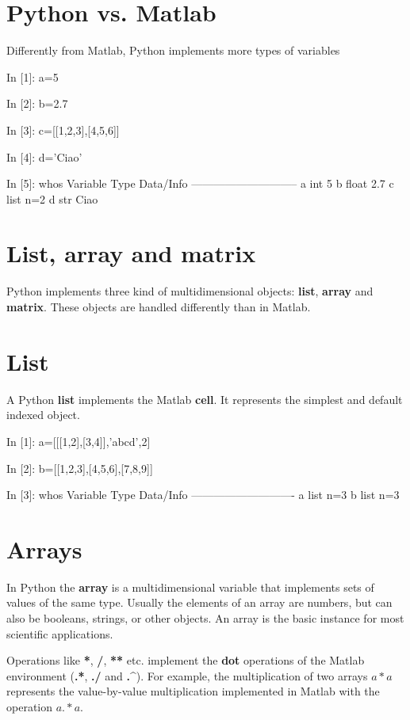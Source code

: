 \section{Python vs. Matlab}

Differently from Matlab, Python implements more types of variables

\begin{code}
In [1]: a=5

In [2]: b=2.7

In [3]: c=[[1,2,3],[4,5,6]]

In [4]: d='Ciao'

In [5]: whos
Variable   Type     Data/Info
-----------------------------
a          int      5
b          float    2.7
c          list     n=2
d          str      Ciao
\end{code}


\section{List, array and matrix}
Python implements three kind of multidimensional objects: \textbf{list}, 
\textbf{array} and \textbf{matrix}. 
These objects are handled differently than in Matlab.

\section{List}
A Python \textbf{list} implements the Matlab \textbf{cell}. It represents 
the simplest and default indexed object. 

\begin{code}
In [1]: a=[[[1,2],[3,4]],'abcd',2]

In [2]: b=[[1,2,3],[4,5,6],[7,8,9]]

In [3]: whos
Variable   Type    Data/Info
----------------------------
a          list    n=3
b          list    n=3
\end{code}


\section{Arrays}
In Python the \textbf{array} is a multidimensional variable that implements 
sets of values of the same type. Usually the elements of an array are numbers, 
but can also be booleans, strings, or other objects. An array is the basic 
instance for most scientific applications.

Operations like \textbf{*}, \textbf{/}, \textbf{**} 
etc. implement the \textbf{dot} operations of the Matlab environment 
(\textbf{.*}, \textbf{./} and \textbf{.\^}).
For example, the multiplication of two arrays $a*a$ represents the 
value-by-value multiplication implemented in Matlab with the operation $a.*a$.

